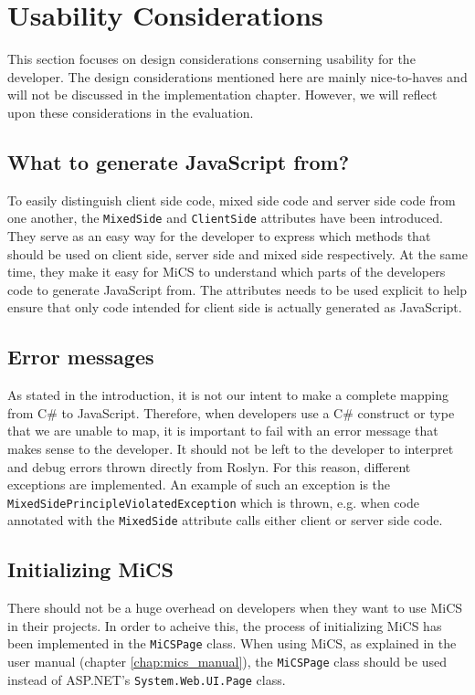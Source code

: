 \section{Usability Considerations}
This section focuses on design considerations conserning usability for the developer. The design considerations mentioned here are mainly nice-to-haves and will not be discussed in the implementation chapter. However, we will reflect upon these considerations in the evaluation.

\subsection{What to generate JavaScript from?} %
\label{sub:what_to_generate_javascript_from}
	To easily distinguish client side code, mixed side code and server side code from one another, the \texttt{MixedSide} and \texttt{ClientSide} attributes have been introduced. They serve as an easy way for the developer to express which methods that should be used on client side, server side and mixed side respectively. At the same time, they make it easy for MiCS to understand which parts of the developers code to generate JavaScript from. The attributes needs to be used explicit to help ensure that only code intended for client side is actually generated as JavaScript.


\subsection{Error messages} %
\label{sub:design_error_messages}
	As stated in the introduction, it is not our intent to make a complete mapping from C\# to JavaScript. Therefore, when developers use a C\# construct or type that we are unable to map, it is important to fail with an error message that makes sense to the developer. It should not be left to the developer to interpret and debug errors thrown directly from Roslyn. For this reason, different exceptions are implemented. An example of such an exception is the \texttt{MixedSidePrincipleViolatedException} which is thrown, e.g. when code annotated with the \texttt{MixedSide} attribute calls either client or server side code.


\subsection{Initializing MiCS} %
\label{sub:initializng_mics}
	There should not be a huge overhead on developers when they want to use MiCS in their projects. In order to acheive this, the process of initializing MiCS has been implemented in the \texttt{MiCSPage} class. When using MiCS, as explained in the user manual (chapter \ref{chap:mics_manual}), the \texttt{MiCSPage} class should be used instead of ASP.NET's \texttt{System.Web.UI.Page} class.
